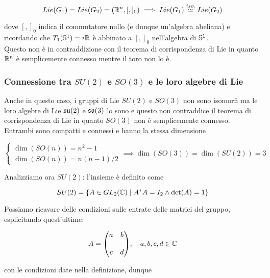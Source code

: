 \begin{equation}
	Lie(G_{1}) = Lie(G_{2}) = (\R^{n},[,]_{0}) \implies Lie(G_{1}) \stackrel{iso.}{\simeq} Lie(G_{2})
\end{equation}

dove $ [,]_{0} $ indica il commutatore nullo (e dunque un'algebra abeliana) e ricordando che $ T_{1}(\S^{1}) = i \R $ è abbinato a $ [,]_{0} $ nell'algebra di $ \S^{1} $.\\
Questo non è in contraddizione con il teorema di corrispondenza di Lie in quanto $ \R^{n} $ è semplicemente connesso mentre il toro non lo è.

\subsubsection{Connessione tra $ SU(2) $ e $ SO(3) $ e le loro algebre di Lie}

Anche in questo caso, i gruppi di Lie $ SU(2) $ e $ SO(3) $ non sono isomorfi ma le loro algebre di Lie $ \su(2) $ e $ \so(3) $ lo sono e questo non contraddice il teorema di corrispondenza di Lie in quanto $ SO(3) $ non è semplicemente connesso.\\
Entrambi sono compatti e connessi e hanno la stessa dimensione

\begin{equation}
	\begin{cases}
		\dim(SO(n)) = n^{2} - 1\\
		\dim(SO(n)) = n(n-1)/2
	\end{cases}
	\implies%
	\dim(SO(3)) = \dim(SU(2)) = 3
\end{equation}

Analizziamo ora $ SU(2) $: l'insieme è definito come

\begin{equation}
	SU(2) = \{ A \in GL_{2}(\C) \mid A^{*} A = I_{2} \wedge \det(A) = 1 \}
\end{equation}

Possiamo ricavare delle condizioni sulle entrate delle matrici del gruppo, esplicitando quest'ultime:

\begin{equation}
	A = \mqty( a & b \\\\ c & d ) \qcomma a,b,c,d \in \C
\end{equation}

con le condizioni date nella definizione, dunque

